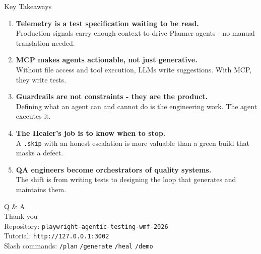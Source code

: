 \documentclass[aspectratio=169,10pt]{beamer}
\begin{document}
\begin{frame}{Key Takeaways}
  \begin{enumerate}
    \setlength\itemsep{0.8em}
    \item \textbf{Telemetry is a test specification waiting to be read.}\\
          \small Production signals carry enough context to drive Planner agents - no manual translation needed.

    \item \textbf{MCP makes agents actionable, not just generative.}\\
          \small Without file access and tool execution, LLMs write suggestions. With MCP, they write tests.

    \item \textbf{Guardrails are not constraints - they are the product.}\\
          \small Defining what an agent can and cannot do is the engineering work. The agent executes it.

    \item \textbf{The Healer's job is to know when to stop.}\\
          \small A \texttt{.skip} with an honest escalation is more valuable than a green build that masks a defect.

    \item \textbf{QA engineers become orchestrators of quality systems.}\\
          \small The shift is from writing tests to designing the loop that generates and maintains them.
  \end{enumerate}
\end{frame}

{
\begin{frame}[plain]
  \vspace{2cm}
  \begin{center}
    {\color{white}\Huge Q \& A}\\[1em]
    {\color{white!70}\large Thank you}\\[2em]
    {\color{white!60}\small
      Repository: \texttt{playwright-agentic-testing-wmf-2026}\\[0.4em]
      Tutorial: \texttt{http://127.0.0.1:3002}\\[0.4em]
      Slash commands: \texttt{/plan} \textperiodcentered{} \texttt{/generate} \textperiodcentered{} \texttt{/heal} \textperiodcentered{} \texttt{/demo}
    }
  \end{center}
\end{frame}
}

\end{document}
